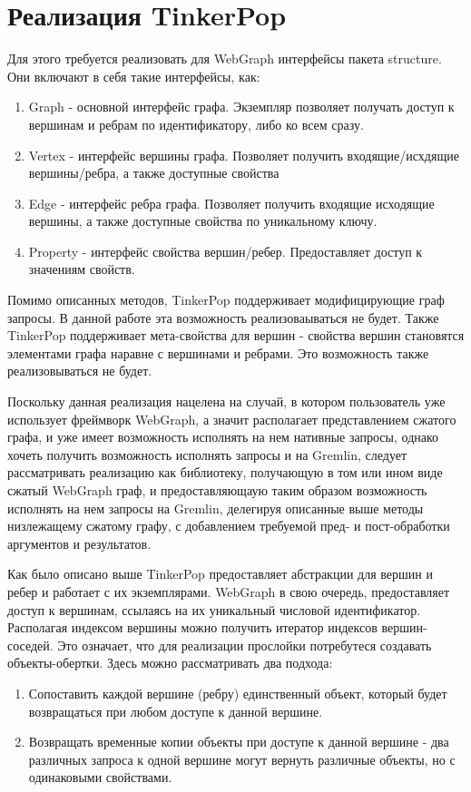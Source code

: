 \documentclass[times,specification,annotation]{itmo-student-thesis}
\begin{document}
\section{Реализация TinkerPop}

Для этого требуется реализовать для WebGraph интерфейсы пакета structure. Они включают в себя такие интерфейсы, как:
\begin{enumerate}
    \item Graph - основной интерфейс графа. Экземпляр позволяет получать доступ к вершинам и ребрам по идентификатору, либо ко всем сразу.
    \item Vertex - интерфейс вершины графа. Позволяет получить входящие/исхдящие вершины/ребра, а также доступные свойства
    \item Edge - интерфейс ребра графа. Позволяет получить входящие исходящие вершины, а также доступные свойства по уникальному ключу.
    \item Property - интерфейс свойства вершин/ребер. Предоставляет доступ к значениям свойств.
\end{enumerate}
Помимо описанных методов, TinkerPop поддерживает модифицирующие граф запросы. В данной работе эта возможность реализоваываться не будет. Также TinkerPop поддерживает мета-свойства для вершин - свойства вершин становятся элементами графа наравне с вершинами и ребрами. Это возможность также реализовываться не будет.

Поскольку данная реализация нацелена на случай, в котором пользователь уже использует фреймворк WebGraph, а значит располагает представлением сжатого графа, и уже имеет возможность исполнять на нем нативные запросы, однако хочеть получить возможность исполнять запросы и на Gremlin, следует рассматривать реализацию как библиотеку, получающую в том или ином виде сжатый WebGraph граф, и предоставляющаую таким образом возможность исполнять на нем запросы на Gremlin, делегируя описанные выше методы низлежащему сжатому графу, с добавлением требуемой пред- и пост-обработки аргументов и результатов.

Как было описано выше TinkerPop предоставляет абстракции для вершин и ребер и работает с их экземплярами. WebGraph в свою очередь, предоставляет доступ к вершинам, ссылаясь на их уникальный числовой идентификатор. Располагая индексом вершины можно получить итератор индексов вершин-соседей. Это означает, что для реализации прослойки потребутеся создавать объекты-обертки. Здесь можно рассматривать два подхода:
\begin{enumerate}
    \item Сопоставить каждой вершине (ребру) единственный объект, который будет возвращаться при любом доступе к данной вершине.
    \item Возвращать временные копии объекты при доступе к данной вершине - два различных запроса к одной вершине могут вернуть различные объекты, но с одинаковыми свойствами.
\end{enumerate}
\end{document}
